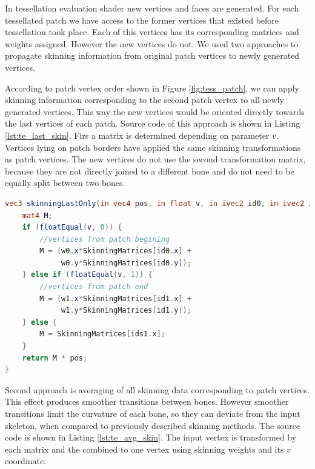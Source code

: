 In tessellation evaluation shader new vertices and faces are generated.
For each tessellated patch we have access to the former vertices that existed before tessellation took place.
Each of this vertices has its corresponding matrices and weights assigned.
However the new vertices do not.
We used two approaches to propagate skinning information from original patch vertices to newly generated vertices.

According to patch vertex order shown in Figure \ref{fig:tess_patch}, we can apply skinning information corresponding to the second patch vertex to all newly generated vertices.
This way the new vertices would be oriented directly towards the last vertices of each patch.
Source code of this approach is shown in Listing \ref{lst:te_last_skin}.
Firs a matrix is determined depending on parameter $v$.
Vertices lying on patch borders have applied the same skinning transformations as patch vertices.
The new vertices do not use the second transformation matrix, because they are not directly joined to a different bone and do not need to be equally split between two bones.

\linespread{1.2}
\begin{lstlisting}[language=GLSL,caption={Linear Blend Skinning implemented in tessellation evaluation shader, using only skinning information from the first patch vertex.},label={lst:te_last_skin}]
vec3 skinningLastOnly(in vec4 pos, in float v, in ivec2 id0, in ivec2 id1, in vec2 w0, in vec2 w1, in mat4 SkinningMatrices[SKINNING_MATRICES]) {
	mat4 M;
	if (floatEqual(v, 0)) {
		//vertices from patch begining
		M = (w0.x*SkinningMatrices[id0.x] +
			 w0.y*SkinningMatrices[id0.y]);
	} else if (floatEqual(v, 1)) {
		//vertices from patch end
		M = (w1.x*SkinningMatrices[id1.x] +
			 w1.y*SkinningMatrices[id1.y]);
	} else {
		M = SkinningMatrices[ids1.x];
	}
	return M * pos;
}
\end{lstlisting} 
\linespread{1.5}

Second approach is averaging of all skinning data corresponding to patch vertices.
This effect produces smoother transitions between bones.
However smoother transitions limit the curvature of each bone, so they can deviate from the input skeleton, when compared to previously described skinning methods.
The source code is shown in Listing \ref{lst:te_avg_skin}.
The input vertex is transformed by each matrix and the combined to one vertex using skinning weights and its $v$ coordinate.

